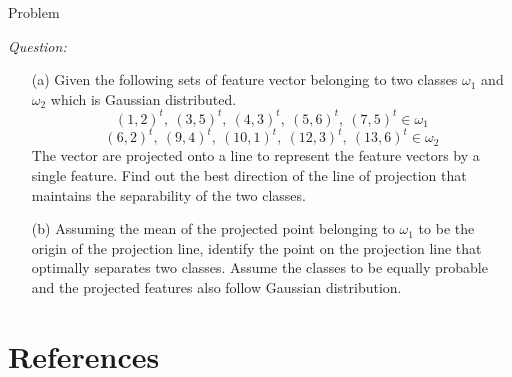 \begin{frame}{Problem}
\begin{footnotesize}
\textit{\color{mycolor2}Question:}
\begin{itemize}
\item[(a)] Given the following sets of feature vector belonging to two classes $\omega_1$ and $\omega_2$ which is Gaussian distributed.
\begin{equation}
(1,2)^t,~(3,5)^t,~(4,3)^t,~(5,6)^t, ~(7,5)^t \in \omega_1 \nonumber
\end{equation}
\begin{equation}
(6,2)^t,~(9,4)^t,~(10,1)^t,~(12,3)^t, ~(13,6)^t \in \omega_2 \nonumber
\end{equation}
The vector are projected onto a line to represent the feature vectors by a single feature. Find out the best direction of the line of projection that maintains the separability of the two classes.\\
\item[(b)] Assuming the mean of the projected point belonging to $\omega_1$ to be the origin of the projection line, identify the point on the projection line that optimally separates two classes. Assume the classes to be equally probable and the projected features also follow Gaussian distribution.
\end{itemize}
\end{footnotesize}
\end{frame}

\begin{frame}{}

\end{frame}

\begin{frame}{}

\end{frame}

\begin{frame}{}

\end{frame}

\section{References}
